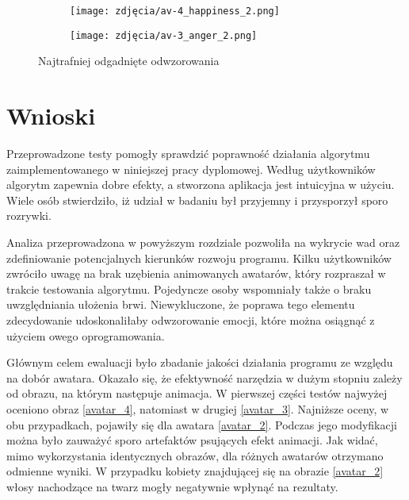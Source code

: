 \begin{figure}[h]
	\centering
	\begin{subfigure}{0.35\textwidth}
		\centering
		\texttt{[image: zdjęcia/av-4\_happiness\_2.png]}
		\subcaption{\label{av-4_happiness_2}}
	\end{subfigure}
	\begin{subfigure}{0.35\textwidth}
		\centering
		\texttt{[image: zdjęcia/av-3\_anger\_2.png]}
		\subcaption{\label{av-3_anger_2}}
	\end{subfigure}

	
	\caption{\label{fig:best_results}Najtrafniej odgadnięte odwzorowania}
\end{figure}


\section{Wnioski}
Przeprowadzone testy pomogły sprawdzić poprawność działania algorytmu zaimplementowanego w niniejszej pracy dyplomowej. Według użytkowników algorytm zapewnia dobre efekty, a stworzona aplikacja jest intuicyjna w użyciu. Wiele osób stwierdziło, iż udział w badaniu był przyjemny i przysporzył sporo rozrywki.

Analiza przeprowadzona w powyższym rozdziale pozwoliła na wykrycie wad oraz zdefiniowanie potencjalnych kierunków rozwoju programu. Kilku użytkowników zwróciło uwagę na brak uzębienia animowanych awatarów, który rozpraszał w trakcie testowania algorytmu. Pojedyncze osoby wspomniały także o braku uwzględniania ułożenia brwi. Niewykluczone, że poprawa tego elementu zdecydowanie udoskonaliłaby odwzorowanie emocji, które można osiągnąć z użyciem owego oprogramowania.

Głównym celem ewaluacji było zbadanie jakości działania programu ze względu na dobór awatara. Okazało się, że efektywność narzędzia w dużym stopniu zależy od obrazu, na którym następuje animacja. W pierwszej części testów najwyżej oceniono obraz \ref{avatar_4}, natomiast w drugiej \ref{avatar_3}. Najniższe oceny, w obu przypadkach, pojawiły się dla awatara \ref{avatar_2}. Podczas jego modyfikacji można było zauważyć sporo artefaktów psujących efekt animacji. Jak widać, mimo wykorzystania identycznych obrazów, dla różnych awatarów otrzymano odmienne wyniki. W przypadku kobiety znajdującej się na obrazie \ref{avatar_2} włosy nachodzące na twarz mogły negatywnie wpłynąć na rezultaty.

